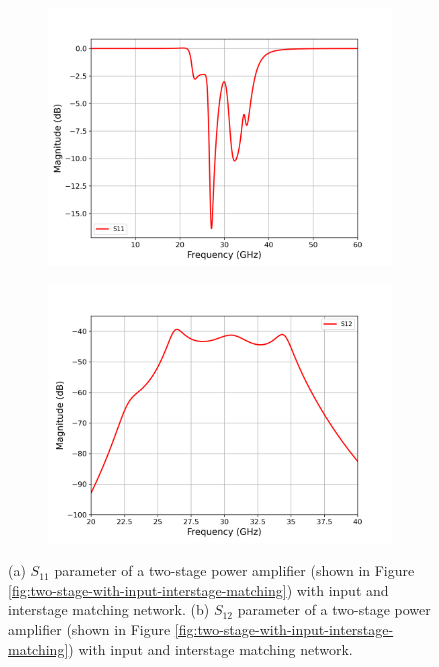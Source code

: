 \begin{figure}[H]
  \centering
  \begin{subfigure}{0.49\textwidth}
    \centering
    \includegraphics[width=\linewidth]{figures/two_stage_withMatching_s11.png}
    \caption{}
    \label{fig:two-stage-withmatching-cadence-s11}
  \end{subfigure}
  \hfill
  \begin{subfigure}{0.49\textwidth}
    \centering
    \includegraphics[width=\linewidth]{figures/two_stage_withMatching_s12.png}
    \caption{}
     \label{fig:two-stage-withmatching-cadence-s12}
  \end{subfigure}
  \caption{(a) $S_{11}$ parameter of a two-stage power amplifier (shown in Figure \ref{fig:two-stage-with-input-interstage-matching}) with input and interstage matching network. (b) $S_{12}$ parameter of a two-stage power amplifier (shown in Figure \ref{fig:two-stage-with-input-interstage-matching}) with input and interstage matching network.}
  \label{fig:two-stage-withmatching-cadence-s11-s12}
\end{figure}

